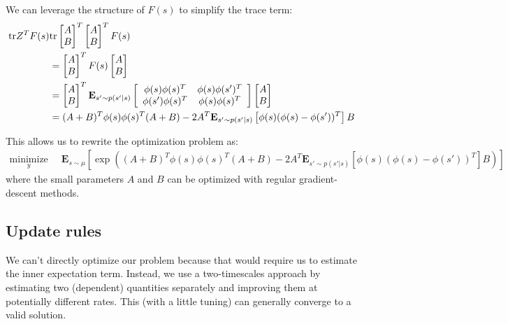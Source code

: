We can leverage the structure of $F(s)$ to simplify the trace term:
\begin{align}
  \text{tr} Z^T F(s)
   & \text{tr}  \begin{bmatrix} A \\ B \end{bmatrix}^T \begin{bmatrix} A \\ B \end{bmatrix}^T F(s)
  \\ & = \begin{bmatrix} A \\ B \end{bmatrix}^T F(s) \begin{bmatrix} A \\ B \end{bmatrix}
  \\ & = \begin{bmatrix} A \\ B \end{bmatrix}^T  \mathbf{E}_{s' \sim p(s'|s)}  \left[ \begin{array}{cc} \phi(s)\phi(s)^T & \phi(s)\phi(s')^T \\ \phi(s')\phi(s)^T & \phi(s)\phi(s)^T \end{array} \right]
  \begin{bmatrix} A \\ B \end{bmatrix}
  \\  & =  (A + B)^T \phi(s)\phi(s)^T (A+B)
  - 2A^T \mathbf{E}_{s' \sim p(s'|s)} \left [\phi(s)(\phi(s)- \phi(s'))^T \right ] B
\end{align}


This allows us to rewrite the optimization problem as:
\begin{align}
  \underset{y}{\text{minimize}} & \;\; \mathbf{E}_{s\sim\mu} \left [ \exp\left((A + B)^T \phi(s)\phi(s)^T (A+B)
    - 2A^T \mathbf{E}_{s' \sim p(s'|s)} \left [\phi(s)(\phi(s)- \phi(s'))^T \right ] B
    \right)  \right ]
\end{align}
where the small parameters $A$ and $B$ can be optimized with regular gradient-descent methods.


\subsection{Update rules}

We can't directly optimize our problem because that would require us to estimate the inner expectation term. Instead, we use a two-timescales approach by estimating two (dependent) quantities separately and improving them at potentially different rates. This (with a little tuning) can generally converge to a valid solution.

